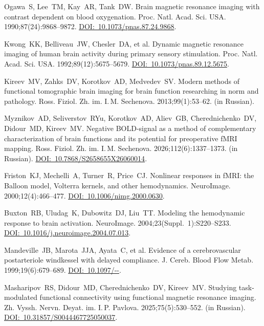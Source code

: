 \documentclass[11pt,twoside,a4paper]{article}
\begin{document}
{\sloppy
\begin{ltrtq}

	{Ogawa~S, Lee~TM, Kay~AR, Tank~DW.} Brain magnetic resonance imaging with contrast dependent on blood oxygenation. {Proc. Natl. Acad. Sci. USA}. 1990;87(24):9868--9872. \href{https://doi.org/10.1073/pnas.87.24.9868}{DOI:~10.1073/\allowbreak pnas.87.24.9868}.

	{Kwong~KK, Belliveau~JW, Chesler~DA, et al.} Dynamic magnetic resonance imaging of human brain activity during primary sensory stimulation. {Proc. Natl. Acad. Sci. USA}. 1992;89(12):5675--5679. \href{https://doi.org/10.1073/pnas.89.12.5675}{DOI:~10.1073/\allowbreak pnas.89.12.5675}.

	{Kireev~MV, Zahks~DV, Korotkov~AD, Medvedev~SV.} Modern methods of functional tomographic brain imaging for brain function researching in norm and pathology. {Ross. Fiziol. Zh. im. I.\,M. Sechenova}. 2013;99(1):53--62. (in Russian).

	{Myznikov~AD, Seliverstov~RYu, Korotkov~AD, Aliev~GB, Cherednichenko~DV, Didour~MD, Kireev~MV.} Negative BOLD-signal as a method of complementary characterization of brain functions and its potential for preoperative fMRI mapping. {Ross. Fiziol. Zh. im. I.\,M. Sechenova}. 2026;112(6):1337--1373. (in Russian). \href{https://doi.org/10.7868/S2658655X26060014}{DOI:~10.7868/\allowbreak S2658655X26060014}.

	{Friston~KJ, Mechelli~A, Turner~R, Price~CJ.} Nonlinear responses in fMRI: the Balloon model, Volterra kernels, and other hemodynamics. {NeuroImage}. 2000;12(4):466--477. \href{https://doi.org/10.1006/nimg.2000.0630}{DOI:~10.1006/\allowbreak nimg.2000.0630}.

	{Buxton~RB, Uludag~K, Dubowitz~DJ, Liu~TT.} Modeling the hemodynamic response to brain activation. {NeuroImage}. 2004;23(Suppl.~1):S220--S233. \href{https://doi.org/10.1016/j.neuroimage.2004.07.013}{DOI:~10.1016/\allowbreak j.neuroimage.2004.07.013}.

	{Mandeville~JB, Marota~JJA, Ayata~C, et al.} Evidence of a cerebrovascular postarteriole windkessel with delayed compliance. {J. Cereb. Blood Flow Metab}. 1999;19(6):679--689. \href{https://doi.org/10.1097/00004647-199906000-00012}{DOI:~10.1097/--}.

	{Masharipov~RS, Didour~MD, Cherednichenko~DV, Kireev~MV.} Studying task-modulated functional connectivity using functional magnetic resonance imaging. {Zh. Vyssh. Nervn. Deyat. im. I.\,P. Pavlova}. 2025;75(5):530--552. (in Russian). \href{https://doi.org/10.31857/S0044467725050037}{DOI:~10.31857/\allowbreak S0044467725050037}.


\end{ltrtq}}
\end{document}
